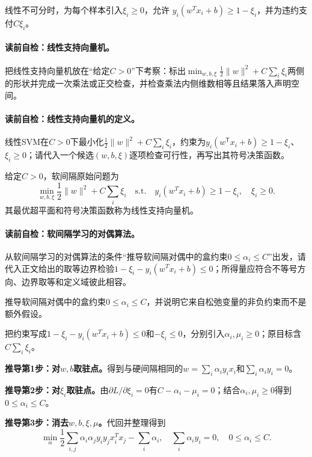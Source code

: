 线性不可分时，为每个样本引入$\xi_i\geq0$，允许
$y_i(w^Tx_i+b)\geq1-\xi_i$，并为违约支付$C\xi_i$。

\paragraph{读前自检：线性支持向量机。}把线性支持向量机放在“给定$C>0$”下考察：标出$\min_{w,b,\xi}\frac12\lVert w\rVert^2+C\sum_i\xi_i$两侧的形状并完成一次乘法或正交检查，并检查乘法内侧维数相等且结果落入声明空间。\par
\paragraph{读前自检：线性支持向量机的定义。}线性SVM在$C>0$下最小化$\frac12\lVert w\rVert^2+C\sum_i\xi_i$，约束为$y_i(w^{\mathsf T}x_i+b)\ge1-\xi_i$、$\xi_i\ge0$；请代入一个候选$(w,b,\xi)$逐项检查可行性，再写出其符号决策函数。\par

\begin{definition}[线性支持向量机]\label{def:V3-C02-soft-svm}
给定$C>0$，软间隔原始问题为
\[
\min_{w,b,\xi}\frac12\lVert w\rVert^2+C\sum_i\xi_i
\quad\text{s.t.}\quad
y_i(w^Tx_i+b)\geq1-\xi_i,\quad \xi_i\geq0.
\]
其最优超平面和符号决策函数称为线性支持向量机。
\end{definition}

\paragraph{读前自检：软间隔学习的对偶算法。}从软间隔学习的对偶算法的条件“推导软间隔对偶中的盒约束$0\leq\alpha_i\leq C$”出发，请代入正文给出的取等边界检验$1-\xi_i-y_i(w^Tx_i+b)\leq0$；所得量应符合不等号方向、边界取等和定义域彼此相容。\par

\begin{derivationgoalbox}
推导软间隔对偶中的盒约束$0\leq\alpha_i\leq C$，并说明它来自松弛变量的非负约束而不是额外假设。
\end{derivationgoalbox}
\begin{derivationprepbox}
把约束写成$1-\xi_i-y_i(w^Tx_i+b)\leq0$和$-\xi_i\leq0$，分别引入$\alpha_i,\mu_i\geq0$；原目标含$C\sum_i\xi_i$。
\end{derivationprepbox}
\textbf{推导第1步：对$w,b$取驻点。}得到与硬间隔相同的$w=\sum_i\alpha_i y_ix_i$和$\sum_i\alpha_i y_i=0$。\par
\textbf{推导第2步：对$\xi_i$取驻点。}由$\partial L/\partial\xi_i=0$有$C-\alpha_i-\mu_i=0$；结合$\alpha_i,\mu_i\geq0$得到$0\leq\alpha_i\leq C$。\par
\textbf{推导第3步：消去$w,b,\xi,\mu$。}代回并整理得到
\[
\min_\alpha\frac12\sum_{i,j}\alpha_i\alpha_jy_iy_jx_i^Tx_j-\sum_i\alpha_i,
\quad
\sum_i\alpha_i y_i=0,\quad0\leq\alpha_i\leq C.
\]

